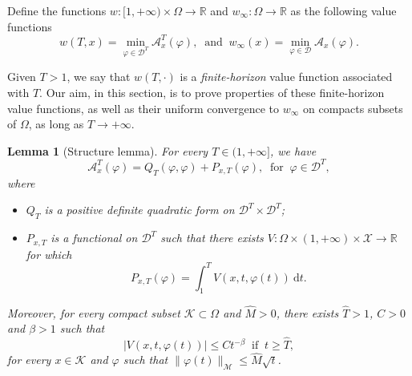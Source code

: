 \documentclass[a4paper,10pt]{amsart}
\newcommand{\ud}{\mathrm{d}}
\theoremstyle{plain}
\newtheorem{lem}[thm]{Lemma}
\theoremstyle{definition}
\numberwithin{equation}{section}
\numberwithin{thm}{section}
\begin{document}
Define the functions $w:[1,+\infty)\times \Omega \to \mathbb R$ and $w_\infty:\Omega \to \mathbb R$ as the following value functions 
\begin{equation}\label{eq:min_action}
w(T,x) = \min_{\varphi\in\mathcal D^T}\mathcal{A}_{x}^T(\varphi), \ \mbox{ and } \ w_\infty(x) = \min_{\varphi\in\mathcal D}\mathcal{A}_{x}(\varphi).
\end{equation}

Given $T>1$, we say that $w(T,\cdot)$ is a \emph{finite-horizon} value function associated with $T$. Our aim, in this section, is to prove properties of these finite-horizon value functions, as well as their uniform convergence to $w_\infty$ on compacts subsets of $\Omega$, as long as $T \to +\infty$.


\begin{lem}[Structure lemma]
\label{lem:quad_pot}
For every $T\in (1,+\infty]$, we have
\[
\mathcal{A}_{x}^T(\varphi)=Q_T(\varphi,\varphi)+P_{x,T}(\varphi), \ \mbox{ for } \ \varphi \in \mathcal{D}^T,
\]
where
\begin{itemize}
    \item $Q_T$ is a positive definite quadratic form on $\mathcal{D}^T \times \mathcal{D}^T$;
    \item $P_{x,T}$ is a functional on $\mathcal{D}^T$ such that there exists $V:\Omega \times (1,+\infty) \times \mathcal{X} \to \mathbb R$ for which
    \[
    P_{x,T}(\varphi)=\int_1^T V(x,t,\varphi(t))\ \ud t.
    \]
\end{itemize}
    Moreover, for every compact subset $\mathcal K\subset\Omega$ and $\hat M>0$, there exists $\hat T>1$, $C>0$ and $\beta>1$ such that
    \begin{equation}
    \label{eq:V_bound}
    \left| V(x,t,\varphi(t))\right| \le C t^{-\beta} \ \mbox{ if } \ t \ge \hat T,
    \end{equation}
    for every $x \in \mathcal{K}$ and $\varphi$ such that $\|\varphi(t)\|_\mathcal{M} \le \hat M \sqrt{t}$.
\end{lem}
\end{document}
